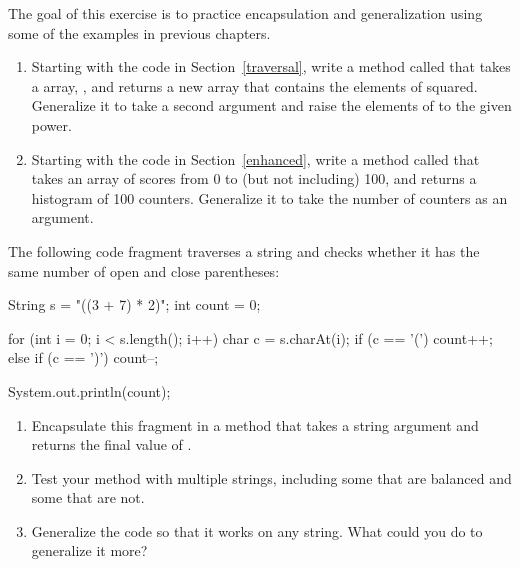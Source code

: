 \begin{exercise}  %

The goal of this exercise is to practice encapsulation and generalization using some of the examples in previous chapters.

\begin{enumerate}

\item Starting with the code in Section~\ref{traversal}, write a method called  that takes a  array, , and returns a new array that contains the elements of  squared.
Generalize it to take a second argument and raise the elements of  to the given power.

\item Starting with the code in Section~\ref{enhanced}, write a method called  that takes an  array of scores from 0 to (but not including) 100, and returns a histogram of 100 counters.
Generalize it to take the number of counters as an argument.

\end{enumerate}

\end{exercise}


\begin{exercise}  %


The following code fragment traverses a string and checks whether it has the same number of open and close parentheses:

\begin{code}
String s = "((3 + 7) * 2)";
int count = 0;

for (int i = 0; i < s.length(); i++) {
    char c = s.charAt(i);
    if (c == '(') {
        count++;
    } else if (c == ')') {
        count--;
    }
}

System.out.println(count);
\end{code}

\begin{enumerate}

\item Encapsulate this fragment in a method that takes a string argument and returns the final value of .

\item Test your method with multiple strings, including some that are balanced and some that are not.

\item Generalize the code so that it works on any string. What could you do to generalize it more?

\end{enumerate}

\end{exercise}
